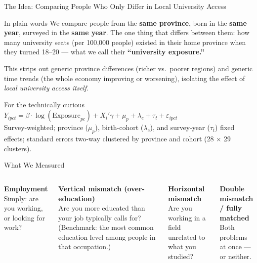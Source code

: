 \documentclass[aspectratio=169,11pt]{beamer}
\begin{document}
\begin{frame}{The Idea: Comparing People Who Only Differ in Local University Access}
\begin{block}{In plain words}
We compare people from the \textbf{same province}, born in the \textbf{same year}, surveyed in the \textbf{same year}. The one thing that differs between them: how many university seats (per 100,000 people) existed in their home province when they turned 18--20 --- what we call their \textbf{``university exposure.''}
\end{block}
\medskip
This strips out generic province differences (richer vs.\ poorer regions) and generic time trends (the whole economy improving or worsening), isolating the effect of \emph{local university access itself}.
\medskip
\begin{block}{For the technically curious}
\footnotesize
$Y_{ipct} = \beta \cdot \log(\text{Exposure}_{pc}) + X_i'\gamma + \mu_p + \lambda_c + \tau_t + \varepsilon_{ipct}$ \\
Survey-weighted; province ($\mu_p$), birth-cohort ($\lambda_c$), and survey-year ($\tau_t$) fixed effects; standard errors two-way clustered by province and cohort (28 $\times$ 29 clusters).
\end{block}
\end{frame}

\begin{frame}[c]{What We Measured}
\begin{columns}[T]
\textbf{Employment}\\
{\small Simply: are you working, or looking for work?}
\vspace{0.6cm}

\textbf{Vertical mismatch (over-education)}\\
{\small Are you more educated than your job typically calls for? (Benchmark: the most common education level among people in that occupation.)}

\textbf{Horizontal mismatch}\\
{\small Are you working in a field unrelated to what you studied?}
\vspace{0.6cm}

\textbf{Double mismatch / fully matched}\\
{\small Both problems at once --- or neither.}
\end{columns}
\end{frame}
\end{document}
